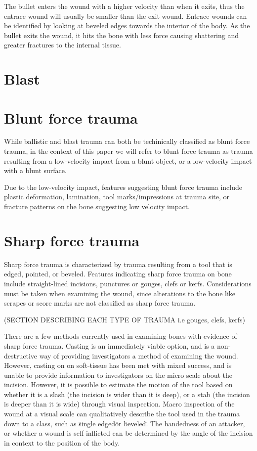 \documentclass[titlepage]{article}
\begin{document}
The bullet enters the wound with a higher velocity than when it exits, thus the entrace wound will usually be smaller than the exit wound. Entrace wounds can be identified by looking at beveled edges towards the interior of the body. As the bullet exits the wound, it hits the bone with less force causing shattering and greater fractures to the internal tissue.

\newpage
\section{Blast}

\newpage
\section{Blunt force trauma}
While ballistic and blast trauma can both be techinically classified as blunt force trauma, in the context of this paper we will refer to blunt force trauma as trauma resulting from a low-velocity impact from a blunt object, or a low-velocity impact with a blunt surface.

Due to the low-velocity impact, features suggesting blunt force trauma include plastic deformation, lamination, tool marks/impressions at trauma site, or fracture patterns on the bone suggesting low velocity impact.\cite{trauma}



\newpage
\section{Sharp force trauma}
Sharp force trauma is characterized by trauma resulting from a tool that is edged, pointed, or beveled. Features indicating sharp force trauma on bone include straight-lined incisions, punctures or gouges, clefs or kerfs. Considerations must be taken when examining the wound, since alterations to the bone like scrapes or score marks are not classified as sharp force trauma. \cite{trauma}

(SECTION DESCRIBING EACH TYPE OF TRAUMA i.e gouges, clefs, kerfs)

There are a few methods currently used in examining bones with evidence of sharp force trauma. Casting is an immediately viable option, and is a non-destructive way of providing investigators a method of examining the wound. However, casting on on soft-tissue has been met with mixed success, and is unable to provide information to investigators on the micro scale about the incision. However, it is possible to estimate the motion of the tool based on whether it is a slash (the incision is wider than it is deep), or a stab (the incision is deeper than it is wide) through visual inspection. \cite{serrated} Macro inspection of the wound at a visual scale can qualitatively describe the tool used in the trauma down to a class, such as \"single edged\" or \"beveled\". The handedness of an attacker, or whether a wound is self inflicted can be determined by the angle of the incision in context to the position of the body.
\end{document}
